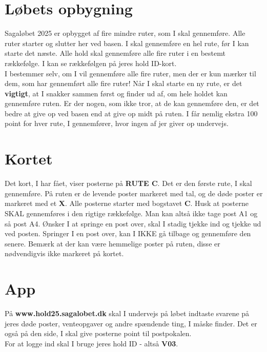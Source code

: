 \section{Løbets opbygning}
Sagaløbet 2025 er opbygget af fire mindre ruter, som I skal gennemføre. Alle ruter starter og slutter her ved basen. I skal gennemføre en hel rute, før I kan starte det næste. Alle hold skal gennemføre alle fire ruter i en bestemt rækkefølge. I kan se rækkefølgen på jeres hold ID-kort.\\\newline
I bestemmer selv, om I vil gennemføre alle fire ruter, men der er kun mærker til dem, som har gennemført alle fire ruter! Når I skal starte en ny rute, er det \textbf{vigtigt}, at I snakker sammen først og finder ud af, om hele holdet kan gennemføre ruten. Er der nogen, som ikke tror, at de kan gennemføre den, er det bedre at give op ved basen end at give op midt på ruten. I får nemlig ekstra 100 point for hver rute, I gennemfører, hvor ingen af jer giver op undervejs.\\
\section{Kortet}
Det kort, I har fået, viser posterne på \textbf{RUTE C}. Det er den første rute, I skal gennemføre. På ruten er de levende poster markeret med tal, og de døde poster er markeret med et \textbf{X}. Alle posterne starter med bogstavet \textbf{C}. Husk at posterne SKAL gennemføres i den rigtige rækkefølge. Man kan altså ikke tage post A1 og så post A4. Ønsker I at springe en post over, skal I stadig tjekke ind og tjekke ud ved posten. Springer I en post over, kan I IKKE gå tilbage og gennemføre den senere. Bemærk at der kan være hemmelige poster på ruten, disse er nødvendigvis ikke markeret på kortet.
\section{App}
På \textbf{www.hold25.sagalobet.dk} skal I undervejs på løbet indtaste svarene på jeres døde poster, venteopgaver og andre spændende ting, I måske finder. Det er også på den side, I skal give posterne point til postpokalen.\\
For at logge ind skal I bruge jeres hold ID - altså \textbf{V03}.
\newpage
